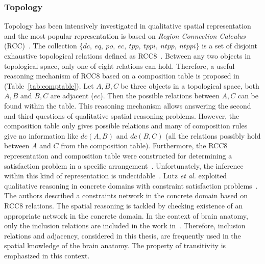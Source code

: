\documentclass{article}
\begin{document}
\subsubsection{Topology}
Topology has been intensively investigated in qualitative spatial representation and the most popular representation is based on \textit{Region Connection Calculus} (RCC)~\cite{cohn1997qualitative}.
The collection $\{dc,~eq,~po,~ec,~tpp,~tppi,~ntpp,~ntppi\}$ is a set of disjoint exhaustive topological relations defined as RCC8~\cite{randell1992spatial}.
Between any two objects in topological space, only one of eight relations can hold.
Therefore, a useful reasoning mechanism of RCC8 based on a composition table is proposed in~\cite{egenhofer1991reasoning} (Table~\ref{tab:comptable}).
Let $A,B,C$ be three objects in a topological space, both $A,B$ and $B,C$ are adjacent ($ec$). Then the possible relations between $A,C$ can be found within the table.
This reasoning mechanism allows answering the second and third questions of qualitative spatial reasoning problems. 
However, the composition table only gives possible relations and many of composition rules give no information like $dc(A,B)$ and $dc(B,C)$ (all the relations possibly
hold between $A$ and $C$ from the composition table).
Furthermore, the RCC8 representation and composition table were constructed for determining a satisfaction problem 
in a specific arrangement~\cite{wessel2000obstacle,wessel00alcra}.
Unfortunately, the inference within this kind of representation is undecidable~\cite{wessel2000obstacle}. 
Lutz \textit{et al.} exploited qualitative reasoning in concrete domains with constraint satisfaction problems~\cite{lutz2007tableau}.
The authors described a constraints network in the concrete domain based on RCC8 relations. The spatial reasoning is 
tackled by checking existence of an appropriate network in the concrete domain.
In the context of brain anatomy, only the inclusion relations are included in the work in~\cite{santos2012region}.
Therefore, inclusion relations and adjacency, considered in this thesis, are frequently used in the spatial knowledge of the  brain anatomy. 
The property of transitivity  is emphasized in this context. 
\end{document}
